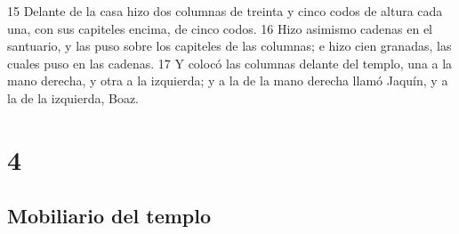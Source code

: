 15 Delante de la casa hizo dos columnas de treinta y cinco codos   de altura cada una, con sus capiteles encima, de cinco codos.
16 Hizo asimismo cadenas en el santuario, y las puso sobre los capiteles de las columnas; e hizo cien granadas, las cuales puso en las cadenas.
17 Y colocó las columnas delante del templo, una a la mano derecha, y otra a la izquierda; y a la de la mano derecha llamó Jaquín, y a la de la izquierda, Boaz.

\chapter{4}

\section*{Mobiliario del templo }


